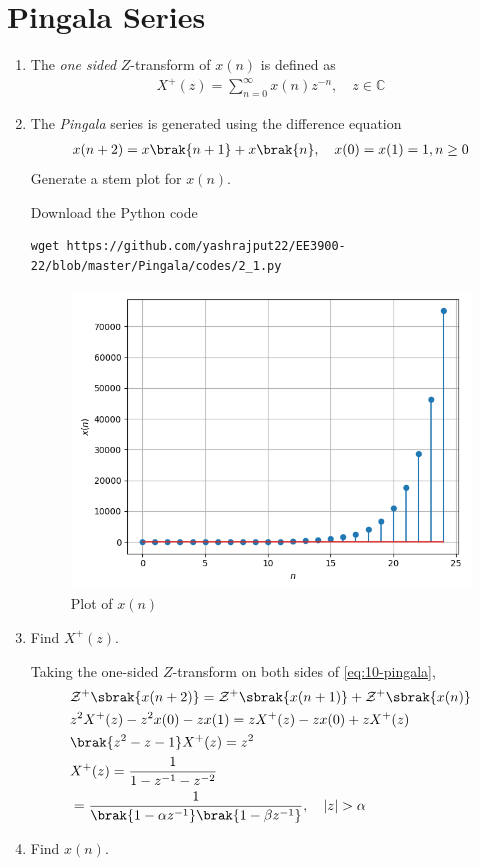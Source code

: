\documentclass[journal,12pt,twocolumn]{IEEEtran}
\renewcommand\thesection{\arabic{section}}
\begin{document}
\section{Pingala Series}
\begin{enumerate}[label=\thesection.\arabic*,ref=\thesection.\theenumi]
\item The {\em one sided} $Z$-transform of $x(n)$ is defined as 
\begin{align}
	X^{+}(z) = \sum_{n = 0}^{\infty}x(n)z^{-n}, \quad z \in \mathbb{C}
\label{eq:one-Z}
\end{align}
	\item The {\em Pingala} series is generated using the difference equation 
\begin{align}
	x(n+2) = x\brak{n+1} + x\brak{n},  \quad x(0) = x(1) = 1, n \ge 0
	\label{eq:10-pingala}
\end{align}
Generate a stem plot for $x(n)$.

\solution
Download the Python code
\begin{lstlisting}
wget https://github.com/yashrajput22/EE3900-22/blob/master/Pingala/codes/2_1.py
\end{lstlisting}
\begin{figure}[!htp]
    \includegraphics[width=\columnwidth]{figs/2_1.png}
    \caption{Plot of $x(n)$}
    \label{fig:xn}
\end{figure}

\newpage
\item Find $X^{+}(z)$.

\solution Taking the one-sided $Z$-transform on both sides of \eqref{eq:10-pingala},
\begin{align}
    &\mathcal{Z}^+\sbrak{x(n + 2)} = \mathcal{Z}^+\sbrak{x(n + 1)} + \mathcal{Z}^+\sbrak{x(n)} \\
    &z^2X^+(z) - z^2x(0) - zx(1) = zX^+(z) - zx(0) + zX^+(z) \\
    &\brak{z^2 - z - 1}X^+(z) = z^2 \\
    &X^+(z) = \frac{1}{1 - z^{-1} - z^{-2}} \\
    &= \frac{1}{\brak{1 - \alpha z^{-1}}\brak{1 - \beta z^{-1}}}, \quad |z| > \alpha
    \label{eq:X-z}
\end{align}
\item Find $x(n)$.


\end{enumerate}
\end{document}
